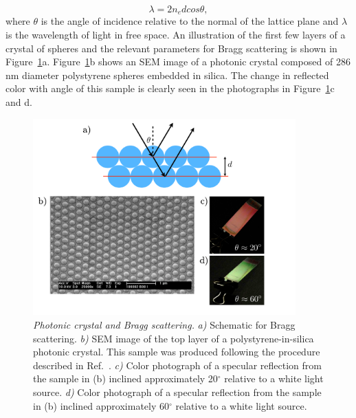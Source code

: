 \begin{equation}\label{eqn:Bragg} 
\lambda = 2n_edcos\theta, 
\end{equation}
where $\theta$ is the angle of incidence relative to the normal of the lattice plane and $\lambda$ is the wavelength of light in free space.
An illustration of the first few layers of a crystal of spheres and the relevant parameters for Bragg scattering is shown in Figure~\ref{fig:Bragg}a.
Figure~\ref{fig:Bragg}b shows an SEM image of a photonic crystal composed of 286 nm diameter polystyrene spheres embedded in silica.
The change in reflected color with angle of this sample is clearly seen in the photographs in Figure~\ref{fig:Bragg}c and d.

\begin{figure}[htbp]
\centering
\includegraphics[width=0.9\textwidth]{figures/BraggWithRealCrystal.pdf}
\caption{\label{fig:Bragg} \emph{Photonic crystal and Bragg scattering.}
\emph{a)} Schematic for Bragg scattering.
\emph{b)} SEM image of the top layer of a polystyrene-in-silica photonic crystal. This sample was produced following the procedure described in Ref.~\cite{Hatton:2010}.
\emph{c)} Color photograph of a specular reflection from the sample in (b) inclined approximately 20$^{\circ}$ relative to a white light source.
\emph{d)} Color photograph of a specular reflection from the sample in (b) inclined approximately 60$^{\circ}$ relative to a white light source.
}
\end{figure} 


